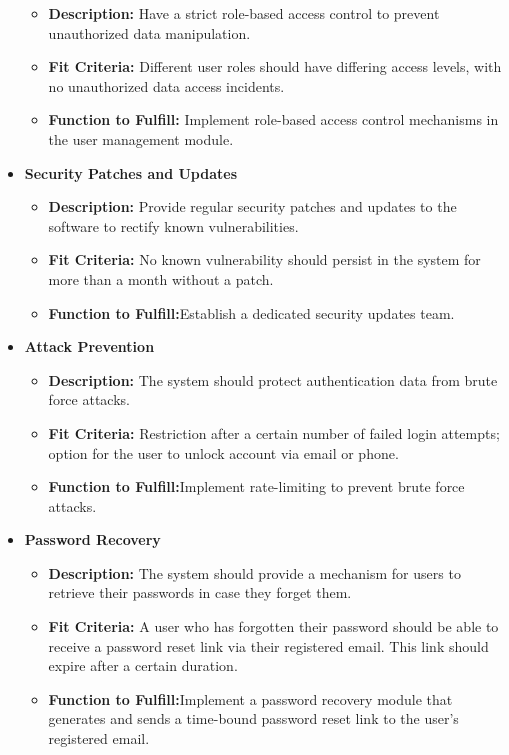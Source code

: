 \documentclass{article}
\newcounter{srnum} %
\newcommand{\rthesrnum}{SR\refstepcounter{srnum}\thesrnum:}
\begin{document}
\begin{itemize}
\begin{itemize}
  \item \textbf{Description:} Have a strict role-based access control to prevent unauthorized data manipulation.
  \item \textbf{Fit Criteria:} Different user roles should have differing access levels, with no unauthorized data access incidents.
  \item \textbf{Function to Fulfill:} Implement role-based access control mechanisms in the user management module.
  \end{itemize}
\item [\rthesrnum \label{Security_Patches_and_Updates}] \textbf{Security Patches and Updates}
  \begin{itemize}
  \item \textbf{Description:} Provide regular security patches and updates to the software to rectify known vulnerabilities.
  \item \textbf{Fit Criteria:} No known vulnerability should persist in the system for more than a month without a patch.
  \item \textbf{Function to Fulfill:}Establish a dedicated security updates team.
  \end{itemize}
\item [\rthesrnum \label{Attack_Prevention}] \textbf{Attack Prevention}
  \begin{itemize}
  \item \textbf{Description:} The system should protect authentication data from brute force attacks.
  \item \textbf{Fit Criteria:} Restriction after a certain number of failed login attempts; option for the user to unlock account via email or phone.
  \item \textbf{Function to Fulfill:}Implement rate-limiting to prevent brute force attacks.
  \end{itemize}
\item [\rthesrnum \label{Password_Recovery}] \textbf{Password Recovery}
  \begin{itemize}
  \item \textbf{Description:} The system should provide a mechanism for users to retrieve their passwords in case they forget them.
  \item \textbf{Fit Criteria:} A user who has forgotten their password should be able to receive a password reset link via their registered email. This link should expire after a certain duration.
  \item \textbf{Function to Fulfill:}Implement a password recovery module that generates and sends a time-bound password reset link to the user's registered email.
  \end{itemize}
\end{itemize}
\end{document}

